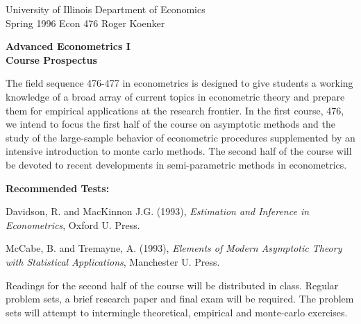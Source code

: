 \setlength{\textwidth}{170mm}
\setlength{\textheight}{220mm}
\setlength{\oddsidemargin}{0mm}
\setlength{\evensidemargin}{10mm}
\setlength{\topmargin}{-10mm}
\def\RR{\hbox{\raise.4ex\hbox{$\scriptstyle{|}$}\hskip-1.85pt R}}
\newcommand{\REF}{\nopagebreak\noindent{\large{\bf
      References}}\vspace{.2in}}

\newcommand{\Ref}[1]{\medskip\noindent\hangafter=1
      \hangindent=20pt\ignorespaces #1}
\pagestyle{empty}



\noindent
University of Illinois \hfill Department of Economics \\
Spring 1996 \hfill Econ 476 \hfill Roger Koenker

\begin{center}
\large{
{\bf Advanced Econometrics I \\
\vspace{2mm}
Course Prospectus}}
\end{center}

\vspace{10mm}
The field sequence 476-477 in econometrics is designed to give students a 
working knowledge of a broad array of current topics in econometric theory and 
prepare them for empirical applications at the research frontier.  In the 
first course, 476, we intend to focus the first half of the course on 
asymptotic methods and the study of the large-sample behavior of econometric 
procedures supplemented by an intensive introduction to monte carlo 
methods.  The second half of the course will be devoted to recent developments 
in semi-parametric methods in econometrics.

\vspace{5mm}
\noindent
{\bf Recommended Tests:}

\Ref Davidson, R. and MacKinnon J.G. (1993), {\em Estimation and Inference in 
Econometrics}, Oxford U. Press.

\Ref McCabe, B. and Tremayne, A. (1993), {\em Elements of Modern Asymptotic 
Theory with Statistical Applications}, Manchester U. Press.

\vspace{5mm}
\noindent
Readings for the second half of the course will be distributed in class.
Regular problem sets, a brief research paper and final exam will be 
required.  The problem sets will attempt to intermingle theoretical, 
empirical and monte-carlo exercises.

